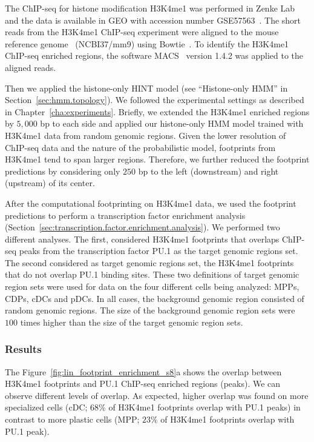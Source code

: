The ChIP-seq for histone modification H3K4me1 was performed in Zenke Lab and the data is available in GEO with accession number GSE57563~\cite{lin2015}. The short reads from the H3K4me1 ChIP-seq experiment were aligned to the mouse reference genome~\cite{encode2012} (NCBI37/mm9) using Bowtie~\cite{langmead2012}. To identify the H3K4me1 ChIP-seq enriched regions, the software MACS~\cite{zhang2008} version 1.4.2 was applied to the aligned reads.

Then we applied the histone-only HINT model (see ``Histone-only HMM'' in Section~\ref{sec:hmm.topology}). We followed the experimental settings as described in Chapter~\ref{cha:experiments}. Briefly, we extended the H3K4me1 enriched regions by $5,000$ bp to each side and applied our histone-only HMM model trained with H3K4me1 data from random genomic regions. Given the lower resolution of ChIP-seq data and the nature of the probabilistic model, footprints from H3K4me1 tend to span larger regions. Therefore, we further reduced the footprint predictions by considering only $250$ bp to the left (downstream) and right (upstream) of its center.

After the computational footprinting on H3K4me1 data, we used the footprint predictions to perform a transcription factor enrichment analysis (Section~\ref{sec:transcription.factor.enrichment.analysis}). We performed two different analyses. The first, considered H3K4me1 footprints that overlaps ChIP-seq peaks from the transcription factor PU.1 as the target genomic regions set. The second considered as target genomic regions set, the H3K4me1 footprints that do not overlap PU.1 binding sites. These two definitions of target genomic region sets were used for data on the four different cells being analyzed: MPPs, CDPs, cDCs and pDCs. In all cases, the background genomic region consisted of random genomic regions. The size of the background genomic region sets were $100$ times higher than the size of the target genomic region sets.

\subsubsection{Results}
\label{sec:cs1.results}

The Figure~\ref{fig:lin_footprint_enrichment_s8}a shows the overlap between H3K4me1 footprints and PU.1 ChIP-seq enriched regions (peaks). We can observe different levels of overlap. As expected, higher overlap was found on more specialized cells (cDC; \approxy$68\%$ of H3K4me1 footprints overlap with PU.1 peaks) in contrast to more plastic cells (MPP; \approxy$23\%$ of H3K4me1 footprints overlap with PU.1 peak).

